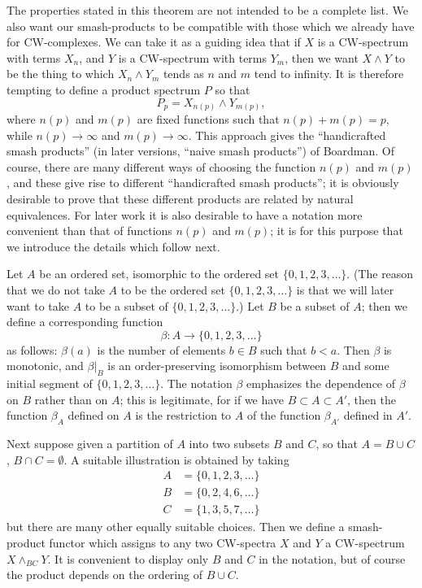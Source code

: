\documentclass[../main]{subfiles}
\begin{document}
The properties stated in this theorem are not intended to be a complete list.
We also want our smash-products to be compatible with those which we already have for CW-complexes.
We can take it as a guiding idea that if $X$ is a CW-spectrum with terms $X_n$, and $Y$ is a CW-spectrum with terms $Y_m$, then we want $X \wedge Y$ to be the thing to which $X_n \wedge Y_m$ tends as $n$ and $m$ tend to infinity.
It is therefore tempting to define a product spectrum $P$ so that
\[
    P_p = X_{n(p)} \wedge Y_{m(p)},
\]
where $n(p)$ and $m(p)$ are fixed functions such that $n(p) + m(p) = p$, while $n(p) \to \infty$ and $m(p) \to \infty$.
This approach gives the ``handicrafted smash products'' (in later versions, ``naive smash products'') of Boardman.
Of course, there are many different ways of choosing the function $n(p)$ and $m(p)$, and these give rise to different ``handicrafted smash products'';
it is obviously desirable to prove that these different products are related by natural equivalences.
For later work it is also desirable to have a notation more convenient than that of functions $n(p)$ and $m(p)$;
it is for this purpose that we introduce the details which follow next.

Let $A$ be an ordered set, isomorphic to the ordered set $\{0, 1, 2, 3, \ldots\}$.
(The reason that we do not take $A$ to be the ordered set $\{0, 1, 2, 3, \ldots\}$ is that we will later want to take $A$ to be a subset of $\{0, 1, 2, 3, \ldots\}$.)
Let $B$ be a subset of $A$;
then we define a corresponding function
\[
    \beta: A \longrightarrow \{0, 1, 2, 3, \ldots\}
\]
as follows:
$\beta(a)$ is the number of elements $b \in B$ such that $b < a$.
Then $\beta$ is monotonic, and $\beta |_B$ is an order-preserving isomorphism between $B$ and some initial segment of $\{0, 1, 2, 3, \ldots\}$.
The notation $\beta$ emphasizes the dependence of $\beta$ on $B$ rather than on $A$;
this is legitimate, for if we have $B \subset A \subset A'$, then the function $\beta_A$ defined on $A$ is the restriction to $A$ of the function $\beta_{A'}$ defined in $A'$.

Next suppose given a partition of $A$ into two subsets $B$ and $C$, so that $A = B \cup C$, $B \cap C = \emptyset$.
A suitable illustration is obtained by taking
    \begin{align*}
        A &= \{0, 1, 2, 3, \ldots\} \\
        B &= \{0, 2, 4, 6, \ldots \} \\
        C &= \{1, 3, 5, 7, \ldots\}
    \end{align*}
but there are many other equally suitable choices.
Then we define a smash-product functor which assigns to any two CW-spectra $X$ and $Y$ a CW-spectrum $X \wedge_{BC} Y$.
It is convenient to display only $B$ and $C$ in the notation, but of course the product depends on the ordering of $B \cup C$.
\end{document}
